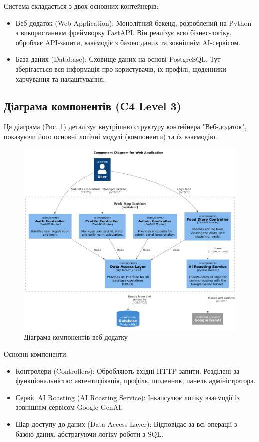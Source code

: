 \documentclass[12pt, a4paper]{article}
\begin{document}
Система складається з двох основних контейнерів:
\begin{itemize}
    \item Веб-додаток (Web Application): Монолітний бекенд, розроблений на
        Python з використанням фреймворку FastAPI. Він реалізує всю
        бізнес-логіку, обробляє API-запити, взаємодіє з базою даних та
        зовнішнім AI-сервісом.
    \item База даних (Database): Сховище даних на основі PostgreSQL. Тут
        зберігається вся інформація про користувачів, їх профілі, щоденники
        харчування та налаштування.
\end{itemize}

\subsection{Діаграма компонентів (C4 Level 3)}

Ця діаграма (Рис. \ref{fig:c4_component}) деталізує внутрішню структуру
контейнера "Веб-додаток", показуючи його основні логічні модулі (компоненти) та
їх взаємодію.

\begin{figure}[h!]
    \centering
    \includegraphics[width=\textwidth]{c4_component.png}
    \caption{Діаграма компонентів веб-додатку}
    \label{fig:c4_component}
\end{figure}

Основні компоненти:
\begin{itemize}
    \item Контролери (Controllers): Обробляють вхідні HTTP-запити. Розділені за
        функціональністю: автентифікація, профіль, щоденник, панель
        адміністратора.

    \item Сервіс AI Roasting (AI Roasting Service): Інкапсулює логіку взаємодії
        із зовнішнім сервісом Google GenAI.

    \item Шар доступу до даних (Data Access Layer): Відповідає за всі операції
        з базою даних, абстрагуючи логіку роботи з SQL.
\end{itemize}
\end{document}
